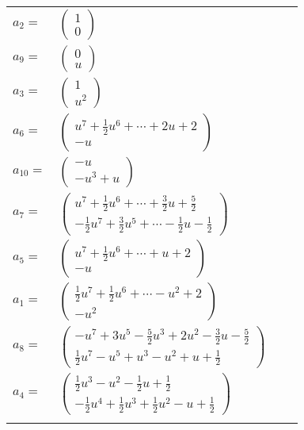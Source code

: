 \documentclass[1p]{elsarticle_modified}
\theoremstyle{definition}
\begin{document}
\begin{tabular}{m{7pt} m{180pt} m{7pt} m{180pt} }
\flushright $a_{2}=$&$\begin{pmatrix}1\\0\end{pmatrix}$ \\
\flushright $a_{9}=$&$\begin{pmatrix}0\\u\end{pmatrix}$ \\
\flushright $a_{3}=$&$\begin{pmatrix}1\\u^2\end{pmatrix}$ \\
\flushright $a_{6}=$&$\begin{pmatrix}u^7+\frac{1}{2} u^6+\cdots+2 u+2\\- u\end{pmatrix}$ \\
\flushright $a_{10}=$&$\begin{pmatrix}- u\\- u^3+u\end{pmatrix}$ \\
\flushright $a_{7}=$&$\begin{pmatrix}u^7+\frac{1}{2} u^6+\cdots+\frac{3}{2} u+\frac{5}{2}\\-\frac{1}{2} u^7+\frac{3}{2} u^5+\cdots-\frac{1}{2} u-\frac{1}{2}\end{pmatrix}$ \\
\flushright $a_{5}=$&$\begin{pmatrix}u^7+\frac{1}{2} u^6+\cdots+u+2\\- u\end{pmatrix}$ \\
\flushright $a_{1}=$&$\begin{pmatrix}\frac{1}{2} u^7+\frac{1}{2} u^6+\cdots- u^2+2\\- u^2\end{pmatrix}$ \\
\flushright $a_{8}=$&$\begin{pmatrix}- u^7+3 u^5-\frac{5}{2} u^3+2 u^2-\frac{3}{2} u-\frac{5}{2}\\\frac{1}{2} u^7- u^5+u^3- u^2+u+\frac{1}{2}\end{pmatrix}$ \\
\flushright $a_{4}=$&$\begin{pmatrix}\frac{1}{2} u^3- u^2-\frac{1}{2} u+\frac{1}{2}\\-\frac{1}{2} u^4+\frac{1}{2} u^3+\frac{1}{2} u^2- u+\frac{1}{2}\end{pmatrix}$\\&\end{tabular}
\end{document}
